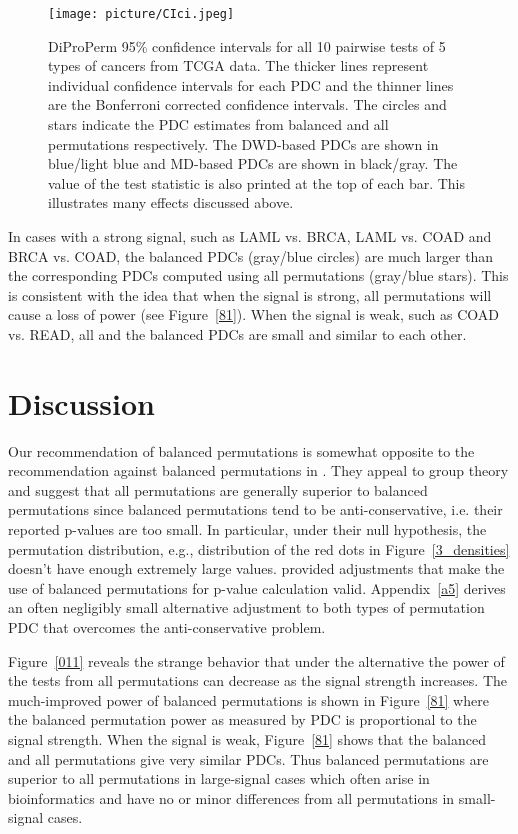 \documentclass[12pt]{article}
\begin{document}
\begin{figure}[H]
  \centering
  \texttt{[image: picture/CIci.jpeg]}\\
 
  \caption{DiProPerm 95\% confidence intervals for all 10 pairwise tests of 5 types of cancers from TCGA data. The thicker lines represent individual confidence intervals for each PDC and the thinner lines are the  Bonferroni corrected confidence intervals. The circles and stars indicate the PDC estimates from balanced and all permutations respectively. The DWD-based PDCs are shown in blue/light blue and MD-based PDCs are shown in black/gray. The value of the test statistic is also printed at the top of each bar. This illustrates many effects discussed above.}%
  \label{cip}
\end{figure}

In cases with a strong signal, such as LAML vs. BRCA, LAML vs. COAD and BRCA vs. COAD, the balanced PDCs (gray/blue circles) are much larger than the corresponding PDCs computed using all permutations (gray/blue stars). This is consistent with the idea that when the signal is strong, all permutations will cause a loss of power (see  Figure~\ref{81}). 
When the signal is weak, such as COAD vs. READ, all and the balanced PDCs are small and similar to each other. 
\section{Discussion}
\label{sb}
Our recommendation of balanced permutations is somewhat opposite to the recommendation against balanced permutations in \citet{southworth2009properties}. They appeal to group theory and suggest that all permutations are generally superior to balanced permutations since balanced permutations tend to be anti-conservative, i.e. their reported p-values are too small. In particular, under their null hypothesis, the permutation distribution, e.g., distribution of the red dots in Figure~\ref{3_densities} doesn't have enough extremely large values. \citet{hemerik2018exact} provided adjustments that make the use of balanced permutations for p-value calculation valid.  Appendix~\ref{a5} derives an often negligibly small alternative adjustment to both types of permutation PDC that overcomes the anti-conservative problem.

Figure~\ref{011} reveals the strange behavior that under the alternative the power of the tests from all permutations can decrease as the signal strength increases. The much-improved power of balanced permutations is shown in Figure~\ref{81} where the balanced permutation power as measured by PDC is proportional to the signal strength. When the signal is weak, Figure~\ref{81} shows that the balanced and all permutations give very similar PDCs. Thus balanced permutations are superior to all permutations in large-signal cases which often arise in bioinformatics and have no or minor differences from all permutations in small-signal cases.
\end{document}
